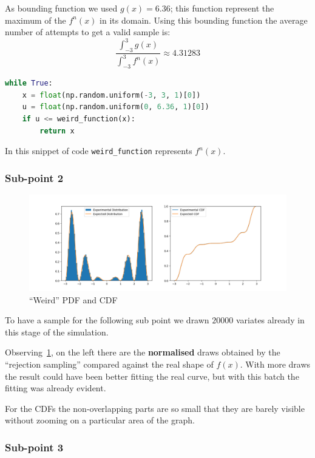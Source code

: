 \documentclass[10pt,a4paper]{article}
\begin{document}
As bounding function we used \(g(x) = 6.36\); this function represent the maximum of the \(f^{n}(x)\) in its domain. Using this bounding function the average number of attempts to get a valid sample is:
\begin{equation*}
  \frac{\int^{3}_{-3}{g(x)}}{\int^{3}_{-3}{f^{n}(x)}}\approx4.31283
\end{equation*}

\begin{lstlisting}[language=python]
while True:
    x = float(np.random.uniform(-3, 3, 1)[0])
    u = float(np.random.uniform(0, 6.36, 1)[0])
    if u <= weird_function(x):
        return x
\end{lstlisting}
In this snippet of code \texttt{weird\_function} represents \(f^{n}(x)\).%

\subsubsection*{Sub-point 2}

\begin{figure}[h]
  \centering
  \includegraphics[scale=0.5]{es2.png}
  \caption{``Weird'' PDF and CDF}
  \label{fig:4}
\end{figure}
To have a sample for the following sub point we drawn \(20000\) variates already in this stage of the simulation.

Observing~\ref{fig:4}, on the left there are the \textbf{normalised} draws obtained by the ``rejection sampling'' compared against the real shape of \(f(x)\). With more draws the result could have been better fitting the real curve, but with this batch the fitting was already evident.

For the CDFs the non-overlapping parts are so small that they are barely visible without zooming on a particular area of the graph.

\subsubsection*{Sub-point 3}
\end{document}
